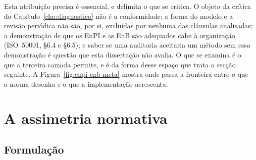 Esta atribuição precisa é essencial, e delimita o que se critica.
O objeto da crítica do Capítulo~\ref{cha:diagnostico} não é a conformidade:
a forma do modelo e a revisão periódica não são, por si, excluídas por
nenhuma das cláusulas analisadas; a demonstração de que os EnPI e as EnB são
adequados cabe à organização (ISO~50001, \S6.4 e \S6.5); e saber se uma
auditoria aceitaria um método sem essa demonstração é questão que esta
dissertação não avalia. O que se examina é o que a terceira camada permite,
e é da forma desse espaço que trata a secção seguinte. A
Figura~\ref{fig:enpi-enb-meta} mostra onde passa a fronteira entre o que a
norma desenha e o que a implementação acrescenta.



\section{A assimetria normativa}
\label{sec:assimetria}

\subsection{Formulação}
\label{sec:assimetria-formulacao}

